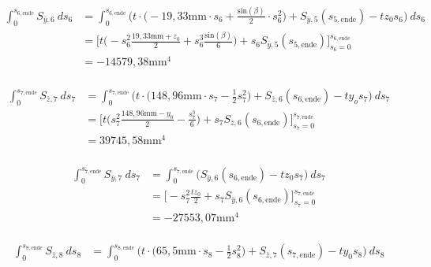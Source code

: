 \begin{itemize}
\begin{equation}
	\end{equation}\\
	\begin{equation}
		\begin{split}
			\int_{0}^{s_{6,\mathrm{ende}}} S_{\bar y,6}\ ds_6 &= \int_{0}^{s_{6,\mathrm{ende}}} \bigg(t\cdot\bigg(-19,33\mathrm{mm}\cdot s_6 + \frac{\mathrm{sin}(\beta)}{2}\cdot s^2_6\bigg) + S_{\bar y,5}(s_{5,\mathrm{ende}})-tz_0s_6\bigg)\ ds_6\\\
			&=\bigg[t\bigg(-s_6^2\frac{19,33\mathrm{mm}+z_0}{2}+s_6^3\frac{\mathrm{sin}(\beta)}{6}\bigg)+ s_6S_{\bar y,5}(s_{5,\mathrm{ende}})\bigg]_{s_6=0}^{s_{6,\mathrm{ende}}}\\\
			&=-14579,38\mathrm{mm}^4
		\end{split}
	\end{equation}\\
	\begin{equation}
		\begin{split}
			\int_{0}^{s_{7,\mathrm{ende}}} S_{\bar z,7}\ ds_7 &= \int_{0}^{s_{7,\mathrm{ende}}}\bigg(t\cdot\bigg(148,96\mathrm{mm}\cdot s_7-\frac{1}{2}s^2_7\bigg) + S_{\bar z,6}(s_{6,\mathrm{ende}})-ty_os_7\bigg)\ ds_7\\\
			&=\bigg[t\bigg(s_7^2\frac{148,96\mathrm{mm}-y_0}{2}-\frac{s_7^3}{6}\bigg)+s_7S_{\bar z,6}(s_{6,\mathrm{ende}})\bigg]_{s_7=0}^{s_{7,\mathrm{ende}}}\\\
			&=39745,58\mathrm{mm}^4
		\end{split}
	\end{equation}\\
	\begin{equation}
		\begin{split}
			\int_{0}^{s_{7,\mathrm{ende}}} S_{\bar y,7}\ ds_7 &= \int_{0}^{s_{7,\mathrm{ende}}} \bigg(S_{\bar y,6}(s_{6,\mathrm{ende}})-tz_0s_7\bigg)\ ds_7\\\
			&=\bigg[-s_7^2\frac{tz_0}{2}+s_7S_{\bar y,6}(s_{6,\mathrm{ende}})\bigg]_{s_7=0}^{s_{7,\mathrm{ende}}}\\\
			&=-27553,07\mathrm{mm}^4
		\end{split}
	\end{equation}\\
	\begin{equation}
		\begin{split}
			\int_{0}^{s_{8,\mathrm{ende}}} S_{\bar z,8}\ ds_8 &= \int_{0}^{s_{8,\mathrm{ende}}} \bigg(t\cdot\bigg(65,5\mathrm{mm}\cdot s_8-\frac{1}{2}s^2_8\bigg) + S_{\bar z,7}(s_{7,\mathrm{ende}})-ty_0s_8\bigg)\ ds_8\\\

\end{split}
\end{equation}
\end{itemize}
